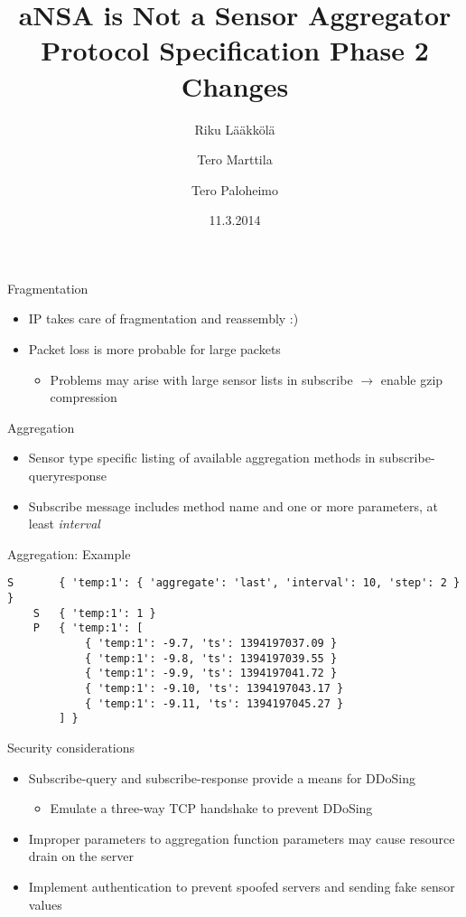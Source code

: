 \documentclass{beamer}
\title[SFO protocol]{aNSA is Not a Sensor Aggregator\\Protocol Specification Phase 2 Changes}
\author{Riku Lääkkölä \and Tero Marttila \and Tero Paloheimo}
\institute{Aalto ELEC}
\date{11.3.2014}
\begin{document}
\begin{frame}
\titlepage
\end{frame}

\begin{frame}{Fragmentation}
\begin{itemize}
\item IP takes care of fragmentation and reassembly :)
\item Packet loss is more probable for large packets
\begin{itemize}
\item Problems may arise with large sensor lists in subscribe $\rightarrow$ 
enable gzip compression
\end{itemize}
\end{itemize}
\end{frame}

\begin{frame}{Aggregation}
\begin{itemize}
\item Sensor type specific listing of available aggregation methods in subscribe-queryresponse
\item Subscribe message includes method name and one or more parameters, at least \emph{interval}
\end{itemize}
\end{frame}

\begin{frame}[fragile]{Aggregation: Example}
\footnotesize
\begin{verbatim}
S       { 'temp:1': { 'aggregate': 'last', 'interval': 10, 'step': 2 } }
    S   { 'temp:1': 1 }
    P   { 'temp:1': [
            { 'temp:1': -9.7, 'ts': 1394197037.09 }
            { 'temp:1': -9.8, 'ts': 1394197039.55 }
            { 'temp:1': -9.9, 'ts': 1394197041.72 }
            { 'temp:1': -9.10, 'ts': 1394197043.17 }
            { 'temp:1': -9.11, 'ts': 1394197045.27 }
        ] }
\end{verbatim}
\end{frame}

\begin{frame}{Security considerations}
\begin{itemize}
  \item Subscribe-query and subscribe-response provide a means for DDoSing
  \begin{itemize}
    \item Emulate a three-way TCP handshake to prevent DDoSing
  \end{itemize}
  \item Improper parameters to aggregation function parameters may cause
  resource drain on the server
  \item Implement authentication to prevent spoofed servers and sending fake
  sensor values
\end{itemize}
\end{frame}
\end{document}
